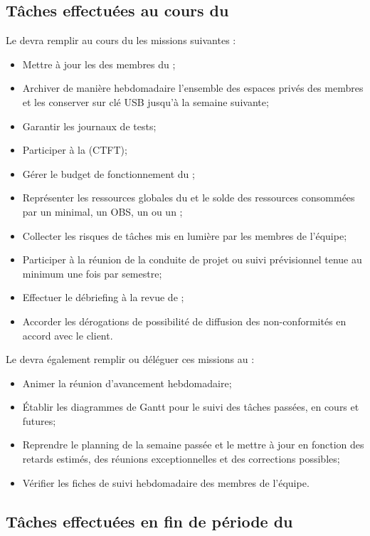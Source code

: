 \subsection*{Tâches effectuées au cours du \PICCourt}

Le \CP{} devra remplir au cours du \PICCourt les missions suivantes :

\begin{itemize}
	\item Mettre à jour les \FC{} des membres du \PICCourt;
	\item Archiver de manière hebdomadaire l’ensemble des espaces privés des membres et les conserver sur clé USB jusqu’à la semaine suivante;
	\item Garantir les journaux de tests;
	\item Participer à la \CTFT (CTFT);
	\item Gérer le budget de fonctionnement du \PICCourt;
	\item Représenter les ressources globales du \PICCourt et le solde des ressources consommées par un \WBSCourt minimal, un OBS, un \RBSCourt{} ou un \FBSCourt;

	\item Collecter les risques de tâches mis en lumière par les membres de l’équipe;
	\item Participer à la réunion de la conduite de projet ou suivi prévisionnel tenue au minimum une fois par semestre;
	\item Effectuer le débriefing à la revue de \PICCourt;
	\item Accorder les dérogations de possibilité de diffusion des non-conformités en accord avec le client.
\end{itemize}

Le \CP{} devra également remplir ou déléguer ces missions au \CPA :
\begin{itemize}
	\item Animer la réunion d’avancement hebdomadaire;
	\item Établir les diagrammes de Gantt pour le suivi des tâches passées, en cours et futures;
	\item Reprendre le planning de la semaine passée et le mettre à jour en fonction des retards estimés, des réunions exceptionnelles et des corrections possibles;
	\item Vérifier les fiches de suivi hebdomadaire des membres de l’équipe.
\end{itemize}

\subsection*{Tâches effectuées en fin de période du \PICCourt}

